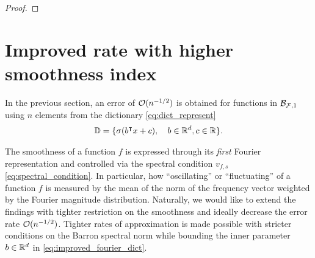 \begin{proof}


\end{proof}

\section{Improved rate with higher smoothness index}

In the previous section, an error of $\mathcal{O}(n^{-1/2})$ is obtained for functions
in $\mathcal{B}_{\mathcal{F}, 1}$ using $n$ elements from the dictionary
\eqref{eq:dict_represent}
\begin{align}
    \label{eq:improved_fourier_dict}
    \mathbb{D} = \{
        \sigma(b{}^{\intercal} x + c), \quad b\in\mathbb{R}^d, c\in\mathbb{R}
    \}.
\end{align}

The smoothness of a function $f$ is expressed through its \textit{first} Fourier
representation and controlled via the spectral condition $v_{f,s}$
\eqref{eq:spectral_condition}. In particular, how ``oscillating'' or
``fluctuating'' of a function $f$ is measured by the mean of the norm of the
frequency vector weighted by the Fourier magnitude distribution. Naturally, we
would like to extend the findings with tighter restriction on the smoothness and
ideally decrease the error rate $\mathcal{O}(n^{-1/2})$. Tighter rates of
approximation is made possible with stricter conditions on the Barron spectral
norm while bounding the inner parameter $b\in\mathbb{R}^d$ in
\eqref{eq:improved_fourier_dict}.

